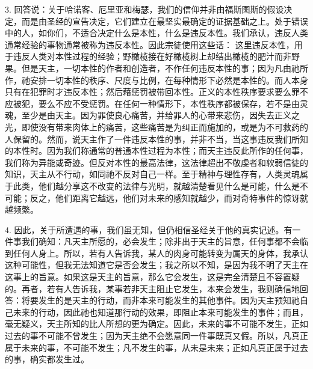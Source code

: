 3.  回答说：关于哈诺客、厄里亚和梅瑟，我们的信仰并非由福斯图斯的假设决定，而是由圣经的宣告决定，它们建立在最坚实最确定的证据基础之上。处于错误中的人，如你们，不适合决定什么是本性，什么是违反本性。我们承认，违反人类通常经验的事物通常被称为违反本性。因此宗徒使用这些话： 这里违反本性，用于违反人类对本性过程的经验；野橄榄接在好橄榄树上却结出橄榄的肥汁而非野果。但是天主，一切本性的作者和创造者，不作任何违反本性的事；因为凡由祂所作，祂安排一切本性的秩序、尺度与比例，在每种情形下必然是本性的。而人本身只有在犯罪时才违反本性；然后藉惩罚被带回本性。正义的本性秩序要求要么罪不应被犯，要么不应不受惩罚。在任何一种情形下，本性秩序都被保存，若不是由灵魂，至少是由天主。因为罪使良心痛苦，并给罪人的心带来悲伤，因失去正义之光，即使没有带来肉体上的痛苦，这些痛苦是为纠正而施加的，或是为不可救药的人保留的。然而，说天主作了一件违反本性的事，并非不当，当这事违反我们所知的本性时。因为我们称通常的普通本性过程为本性；而天主违反此所作的任何事，我们称为异能或奇迹。但反对本性的最高法律，这法律超出不敬虔者和软弱信徒的知识，天主从不行动，如同祂不反对自己一样。至于精神与理性存有，人类灵魂属于此类，他们越分享这不改变的法律与光明，就越清楚看见什么是可能，什么是不可能；反之，他们距离它越远，他们对未来的感知就越少，而对奇特事件的惊讶就越频繁。\par

4. 因此，关于所遭遇的事，我们虽无知，但仍相信圣经关于他的真实记述。有一件事我们确知：凡天主所愿的，必会发生；除非出于天主的旨意，任何事都不会临到任何人身上。所以，若有人告诉我，某人的肉身可能转变为属天的身体，我承认这种可能性，但我无法知道它是否会发生；我之所以不知，是因为我不明了天主在这事上的旨意。如果这是天主的旨意，那么它会发生，这是完全清楚且不容置疑的。再者，若有人告诉我，某事若非天主阻止它发生，本来会发生，我则确信地回答：将要发生的是天主的行动，而非本来可能发生的其他事件。因为天主预知祂自己未来的行动，因此祂也知道那行动的效果，即阻止本来可能发生的事件；而且，毫无疑义，天主所知的比人所想的更为确定。因此，未来的事不可能不发生，正如过去的事不可能不曾发生；因为天主绝不会愿意同一件事既真又假。所以，凡真正属于未来的事，不可能不发生；凡不发生的事，从未是未来；正如凡真正属于过去的事，确实都发生过。\par

